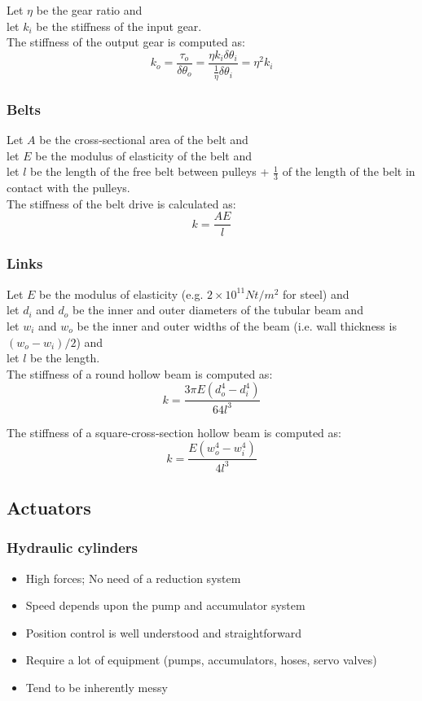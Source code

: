 \documentclass[10pt,a4paper]{article}
\begin{document}
Let $\eta$ be the gear ratio and \\
let $k_i$ be the stiffness of the input gear. \\
The stiffness of the output gear is computed as:
$$
	k_o = \frac{\tau_o}{\delta\theta_o} = \frac{\eta k_i \delta \theta_i}{\frac 1 \eta \delta \theta_i} = \eta^2 k_i
$$

\subsubsection{Belts}
Let $A$ be the cross-sectional area of the belt and \\
let $E$ be the modulus of elasticity of the belt and \\
let $l$ be the length of the free belt between pulleys + $\frac 1 3$ of the length of the belt in contact  with the pulleys. \\
The stiffness of the belt drive is calculated as:
$$
	k = \frac{AE}{l}
$$

\subsubsection{Links}
Let $E$ be the modulus of elasticity (e.g. $2 \times 10^{11} Nt/m^2$ for steel) and \\
let $d_i$ and $d_o$ be the inner and outer diameters of the tubular beam and \\
let $w_i$ and $w_o$ be the inner and outer widths of the beam (i.e. wall thickness is $(w_o - w_i)/2$) and \\
let $l$ be the length. \\

The stiffness of a round hollow beam is computed as:
$$
	k = \frac{3 \pi E (d_o^4 - d_i^4)}{64 l^3}
$$

The stiffness of a square-cross-section hollow beam is computed as:
$$
	k = \frac{E (w_o^4 - w_i^4)}{4l^3}
$$

\subsection{Actuators}
\subsubsection{Hydraulic cylinders}
\begin{itemize}
	\item High forces; No need of a reduction system
	\item Speed depends upon the pump and accumulator system
	\item Position control is well understood and straightforward
	\item Require a lot of equipment (pumps, accumulators, hoses, servo valves)
	\item Tend to be inherently messy
\end{itemize}
\end{document}
